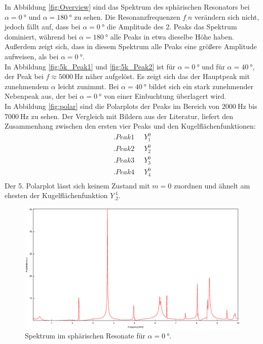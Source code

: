 In Abbildung \ref{fig:Overview} sind das Spektrum des sphärischen Resonators bei $\alpha=\SI{0}{\degree}$ und $\alpha=\SI{180}{\degree}$
zu sehen.
Die Resonanzfrequenzen $f_.n$ verändern sich nicht, jedoch fällt auf, dass bei $\alpha=\SI{0}{\degree}$ die Amplitude des 2. Peaks das Spektrum dominiert, während bei $\alpha=\SI{180}{\degree}$ alle Peaks in etwa dieselbe Höhe haben. Außerdem zeigt sich, dass in diesem Spektrum alle Peaks eine größere Amplitude aufweisen, als bei $\alpha=\SI{0}{\degree}$.\\
In Abbildung \ref{fig:5k_Peak1} und \ref{fig:5k_Peak2} ist für $\alpha=\SI{0}{\degree}$ und für $\alpha=\SI{40}{\degree}$, der Peak bei $f\approx\SI{5000}{\hertz}$ näher aufgelöst.
Es zeigt sich das der Hauptpeak mit zunehmendem $\alpha$ leicht zunimmt. Bei $\alpha=\SI{40}{\degree}$ bildet sich ein stark zunehmender Nebenpeak aus, der bei $\alpha=\SI{0}{\degree}$ von einer Einbuchtung überlagert wird.\\
In Abbildung \ref{fig:polar} sind die Polarplots der Peaks im Bereich von $\SI{2000}{\hertz}$ bis $\SI{7000}{\hertz}$ zu sehen.
Der Vergleich mit Bildern aus der Literatur\cite{V23}, liefert den Zusammenhang zwischen den ersten vier Peaks und den Kugelflächenfunktionen:
\begin{align*}
.{Peak 1}&\mathop{\widehat{=}} Y^0_1\\
.{Peak 2}&\mathop{\widehat{=}} Y^0_2\\
.{Peak 3}&\mathop{\widehat{=}} Y^0_3\\
.{Peak 4}&\mathop{\widehat{=}} Y^0_4\\
\end{align*}
Der 5. Polarplot lässt sich keinem Zustand mit $m=0$ zuordnen und ähnelt am ehesten der Kugelflächenfunktion $Y^.1_.2$.
\begin{figure}
\centering
\includegraphics[width=\linewidth-60pt,height=\textheight-60pt,keepaspectratio]{FP-V23data/2.1_0degree.eps}
\caption{Spektrum im sphärischen Resonate für $\alpha=\SI{0}{\degree}$.}
\label{fig:Overview1}
\end{figure}
